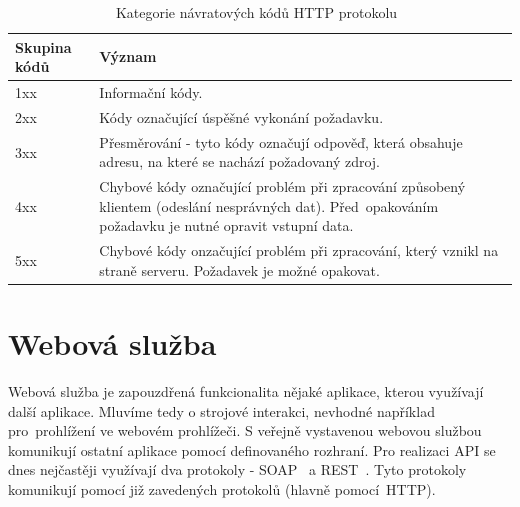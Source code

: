 \begin{table}[ht!]
  \centering
  \begin{tabular}{|l|p{9cm}|}
    \hline
    \textbf{Skupina kódů} & \textbf{Význam}\\
    \hline
    1xx & Informační kódy.\\
    \hline
    2xx & Kódy označující úspěšné vykonání požadavku.\\
    \hline
    3xx & Přesměrování - tyto kódy označují odpověď, která obsahuje adresu, na které se nachází požadovaný zdroj.\\
    \hline
    4xx & Chybové kódy označující problém při zpracování způsobený klientem (odeslání nesprávných dat). Před~opakováním požadavku je nutné opravit vstupní data.\\
    \hline
    5xx & Chybové kódy onzačující problém při zpracování, který vznikl na straně serveru. Požadavek je možné opakovat.\\
    \hline
  \end{tabular}
  \caption{Kategorie návratových kódů HTTP protokolu~\cite{rest_vse}}
  \label{tab:http_kody}
\end{table}
  
\section{Webová služba}
  
Webová služba je zapouzdřená funkcionalita nějaké aplikace, kterou využívají další aplikace.
Mluvíme tedy o strojové interakci, nevhodné například pro~prohlížení ve webovém prohlížeči.
S veřejně vystavenou webovou službou komunikují ostatní aplikace pomocí definovaného rozhraní.
Pro realizaci API se dnes nejčastěji využívají dva protokoly - SOAP~\cite{soap} a REST~\cite{rest}.
Tyto protokoly komunikují pomocí již zavedených protokolů (hlavně pomocí~HTTP).